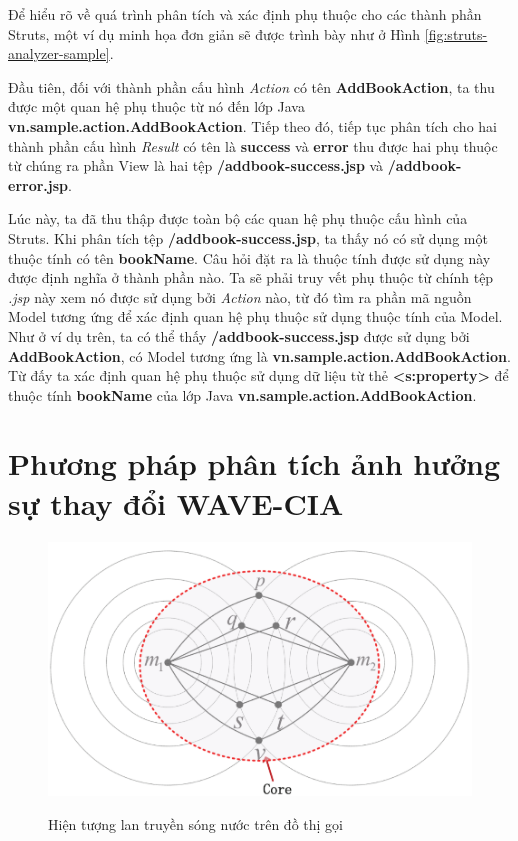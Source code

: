 \documentclass[12pt]{report}
\begin{document}
Để hiểu rõ về quá trình phân tích và xác định phụ thuộc cho các thành phần Struts, một ví dụ minh họa đơn giản sẽ được trình bày như ở Hình \ref{fig:struts-analyzer-sample}.

Đầu tiên, đối với thành phần cấu hình \textit{Action} có tên \textbf{AddBookAction}, ta thu được một quan hệ phụ thuộc từ nó đến lớp Java \textbf{vn.sample.action.AddBookAction}. Tiếp theo đó, tiếp tục phân tích cho hai thành phần cấu hình \textit{Result} có tên là \textbf{success} và \textbf{error} thu được hai phụ thuộc từ chúng ra phần View là hai tệp \textbf{/addbook-success.jsp} và \textbf{/addbook-error.jsp}.

Lúc này, ta đã thu thập được toàn bộ các quan hệ phụ thuộc cấu hình của Struts. Khi phân tích tệp \textbf{/addbook-success.jsp}, ta thấy nó có sử dụng một thuộc tính có tên \textbf{bookName}. Câu hỏi đặt ra là thuộc tính được sử dụng này được định nghĩa ở thành phần nào. Ta sẽ phải truy vết phụ thuộc từ chính tệp \textit{.jsp} này xem nó được sử dụng bởi \textit{Action} nào, từ đó tìm ra phần mã nguồn Model tương ứng để xác định quan hệ phụ thuộc sử dụng thuộc tính của Model. Như ở ví dụ trên, ta có thể thấy \textbf{/addbook-success.jsp} được sử dụng bởi \textbf{AddBookAction}, có Model tương ứng là \textbf{vn.sample.action.AddBookAction}. Từ đấy ta xác định quan hệ phụ thuộc sử dụng dữ liệu từ thẻ \textbf{<s:property>} để thuộc tính \textbf{bookName} của lớp Java \textbf{vn.sample.action.AddBookAction}.

\section{Phương pháp phân tích ảnh hưởng sự thay đổi WAVE-CIA}

\begin{figure}[h]
	\centering
	\includegraphics[scale=0.45]{wave-cia-phenomenon}
	\label{wave-cia-phenomenon}
	\caption{Hiện tượng lan truyền sóng nước trên đồ thị gọi}
\end{figure}
\end{document}
